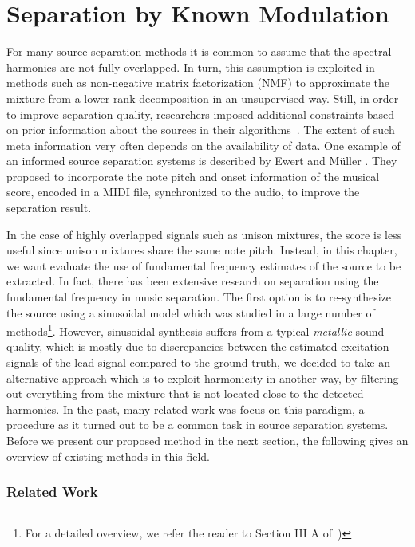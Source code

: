 \chapter{Separation by Known Modulation}
\label{cha:known}

For many source separation methods it is common to assume that the spectral harmonics are not fully overlapped.
In turn, this assumption is exploited in methods such as non-negative matrix factorization (NMF) to approximate the mixture from a lower-rank decomposition in an unsupervised way.
Still, in order to improve separation quality, researchers imposed additional constraints based on  prior information about the sources in their algorithms~\cite{ozerov12}.
The extent of such meta information very often depends on 
the availability of data.
One example of an informed source separation systems is described by Ewert and M\"uller \cite{ewert12}.
They proposed to incorporate the note pitch and onset information of the musical score, encoded in a MIDI file, synchronized to the audio, to improve the separation result.
\par
In the case of highly overlapped signals such as unison mixtures, the score is less useful since unison mixtures share the same note pitch.
Instead, in this chapter, we want evaluate the use of fundamental frequency estimates of the source to be extracted.
In fact, there has been extensive research on separation using the fundamental frequency in music separation.
The first option is to re-synthesize the source using a sinusoidal model which was studied in a large number of methods\footnote{For a detailed overview, we refer the reader to Section III A of~\cite{rafii})}.
However, sinusoidal synthesis suffers from a typical \textit{metallic} sound quality, which is mostly due to discrepancies between the estimated excitation signals of the lead signal compared to the ground truth, we decided to take an alternative approach which is to exploit harmonicity in another way, by filtering out everything from the mixture that is not located close to the detected harmonics.
In the past, many related work was focus on this paradigm, a procedure as it turned out to be a common task in source separation systems. 
Before we present our proposed method in the next section, the following gives an overview of existing methods in this field.

\subsection*{Related Work}

